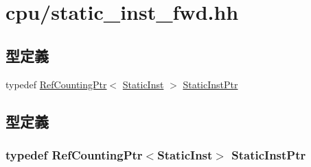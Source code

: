 \hypertarget{static__inst__fwd_8hh}{
\section{cpu/static\_\-inst\_\-fwd.hh}
\label{static__inst__fwd_8hh}
}
\subsection*{型定義}
\begin{DoxyCompactItemize}
\item 
typedef \hyperlink{classRefCountingPtr}{RefCountingPtr}$<$ \hyperlink{classStaticInst}{StaticInst} $>$ \hyperlink{static__inst__fwd_8hh_a4b6fbf82d4c9efbe38369f7003d5b253}{StaticInstPtr}
\end{DoxyCompactItemize}


\subsection{型定義}
\hypertarget{static__inst__fwd_8hh_a4b6fbf82d4c9efbe38369f7003d5b253}{
\subsubsection[{StaticInstPtr}]{\setlength{\rightskip}{0pt plus 5cm}typedef {\bf RefCountingPtr}$<${\bf StaticInst}$>$ {\bf StaticInstPtr}}}
\label{static__inst__fwd_8hh_a4b6fbf82d4c9efbe38369f7003d5b253}
